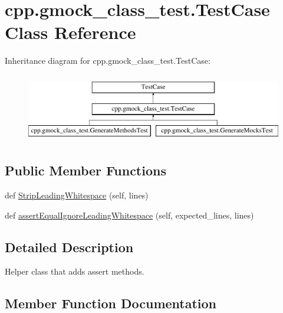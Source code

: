 \hypertarget{classcpp_1_1gmock__class__test_1_1TestCase}{}\section{cpp.\+gmock\+\_\+class\+\_\+test.\+Test\+Case Class Reference}
\label{classcpp_1_1gmock__class__test_1_1TestCase}
Inheritance diagram for cpp.\+gmock\+\_\+class\+\_\+test.\+Test\+Case\+:\begin{figure}[H]
\begin{center}
\leavevmode
\includegraphics[height=3.000000cm]{classcpp_1_1gmock__class__test_1_1TestCase}
\end{center}
\end{figure}
\subsection*{Public Member Functions}
\begin{DoxyCompactItemize}
\item 
def \mbox{\hyperlink{classcpp_1_1gmock__class__test_1_1TestCase_a366b15717eebc41e397357868c5734c5}{Strip\+Leading\+Whitespace}} (self, lines)
\item 
def \mbox{\hyperlink{classcpp_1_1gmock__class__test_1_1TestCase_a68f88bba11511f8c582123d47bf80464}{assert\+Equal\+Ignore\+Leading\+Whitespace}} (self, expected\+\_\+lines, lines)
\end{DoxyCompactItemize}


\subsection{Detailed Description}
\begin{DoxyVerb}Helper class that adds assert methods.\end{DoxyVerb}
 

\subsection{Member Function Documentation}
\mbox{\label{classcpp_1_1gmock__class__test_1_1TestCase_a68f88bba11511f8c582123d47bf80464}} 
